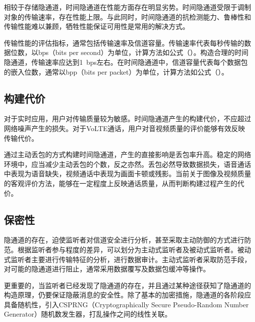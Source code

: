 相较于存储隐通道，时间隐通道在性能方面存在明显劣势。时间隐通道受限于调制对象的传输速率，存在性能上限。与此同时，时间隐通道的抗检测能力、鲁棒性和传输性能难以兼顾，牺牲性能保证可用性是常用的解决方式。


传输性能的评估指标，通常包括传输速率及信道容量。传输速率代表每秒传输的数据位数，以bps（bits per second）为单位，计算方法如公式（）。构造合理的时间隐通道，传输速率应达到{1\ bps}左右。在时间隐通道中，信道容量代表每个数据包的嵌入位数，通常以bpp（bits per packet）为单位，计算方法如公式（）。

\subsection{构建代价}
\label{chap:backinfo:metric:cost}

对于实时应用，用户对传输质量较为敏感。时间隐通道产生的构建代价，不应超过网络噪声产生的损失。对于VoLTE通话，用户对音视频质量的评价能够有效反映传输代价。

通过主动丢包的方式构建时间隐通道，产生的直接影响是丢包率升高。稳定的网络环境中，应当减少主动丢包的个数，反之亦然。丢包必然导致数据损失，语音通话中表现为语音缺失，视频通话中表现为画面卡顿或残影。当前关于图像及视频质量的客观评价方法，能够在一定程度上反映通话质量，从而判断构建过程产生的代价。

\subsection{保密性}
\label{chap:backinfo:metric:non-disclosure}

隐通道的存在，迫使监听者对信道安全进行分析，甚至采取主动防御的方式进行防范。根据监听者参与程度的差异，可以划分为主动式监听者及被动式监听者。被动式监听者主要进行传输特征的分析，进行数据审计。主动式监听者采取防范手段，对可能的隐通道进行阻止，通常采用数据覆写及数据包缓冲等操作。

更重要的，当监听者已经发现了隐通道的存在，并且通过某种途径获知了隐通道的构造原理，仍要保证隐蔽消息的安全性。除了基本的加密措施，隐通道的各阶段应具备随机性，引入CSPRNG（Cryptographically Secure Pseudo-Random Number Generator）随机数发生器，打乱操作之间的线性关联。
